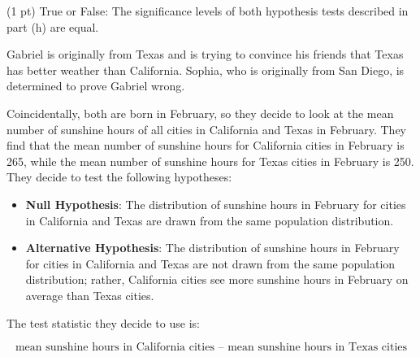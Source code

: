 \begin{prob}[(17 pts)]
\begin{subprobset}
\begin{subprob}

\end{subprob}

\begin{subprob}(1 pt) True or False: The significance levels of both hypothesis tests described in part (h) are equal.


\end{subprob}

\end{subprobset}

\end{prob}

\newpage

\begin{prob}[(8 pts)]

Gabriel is originally from Texas and is trying to convince his friends that Texas has better weather than California. Sophia, who is originally from San Diego, is determined to prove Gabriel wrong.

Coincidentally, both are born in February, so they decide to look at the mean number of sunshine hours of all cities in California and Texas in February. They find that the mean number of sunshine hours for California cities in February is 265, while the mean number of sunshine hours for Texas cities in February is 250. They decide to test the following hypotheses:

\begin{itemize}
    \item \textbf{Null Hypothesis}: The distribution of sunshine hours in February for cities in California and Texas are drawn from the same population distribution.
    \item \textbf{Alternative Hypothesis}: The distribution of sunshine hours in February for cities in California and Texas are not drawn from the same population distribution; rather, California cities see more sunshine hours in February on average than Texas cities.
\end{itemize}

The test statistic they decide to use is:

$$\text{mean sunshine hours in California cities – mean sunshine hours in Texas cities}$$

\vspace{.1in}


\end{prob}
